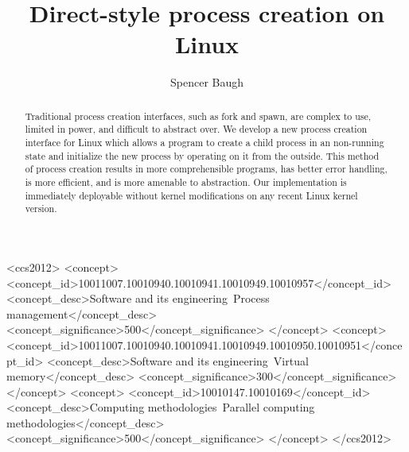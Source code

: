 \documentclass{acmart}
\begin{document}
\title[Direct-style process creation on Linux]{Direct-style process creation on Linux}

\author{Spencer Baugh}

\begin{abstract}
Traditional process creation interfaces,
such as fork and spawn,
are complex to use, limited in power, and difficult to abstract over.
We develop a new process creation interface for Linux
which allows a program to create a child process in an non-running state
and initialize the new process by operating on it from the outside.
This method of process creation results in more comprehensible programs, 
has better error handling,
is more efficient,
and is more amenable to abstraction.
Our implementation is immediately deployable without kernel modifications on any recent Linux kernel version.
\end{abstract}

%
%
\begin{CCSXML}
<ccs2012>
   <concept>
       <concept_id>10011007.10010940.10010941.10010949.10010957</concept_id>
       <concept_desc>Software and its engineering~Process management</concept_desc>
       <concept_significance>500</concept_significance>
       </concept>
   <concept>
       <concept_id>10011007.10010940.10010941.10010949.10010950.10010951</concept_id>
       <concept_desc>Software and its engineering~Virtual memory</concept_desc>
       <concept_significance>300</concept_significance>
       </concept>
   <concept>
       <concept_id>10010147.10010169</concept_id>
       <concept_desc>Computing methodologies~Parallel computing methodologies</concept_desc>
       <concept_significance>500</concept_significance>
       </concept>
 </ccs2012>
\end{CCSXML}



\maketitle
\end{document}
